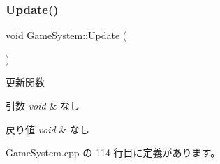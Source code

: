 \subsubsection{\texorpdfstring{Update()}{Update()}}
{\footnotesize\ttfamily void Game\+System\+::\+Update (\begin{DoxyParamCaption}{ }\end{DoxyParamCaption})}



更新関数 


\begin{DoxyParams}{引数}
{\em void} & なし \\
\hline
\end{DoxyParams}

\begin{DoxyRetVals}{戻り値}
{\em void} & なし \\
\hline
\end{DoxyRetVals}


 Game\+System.\+cpp の 114 行目に定義があります。

